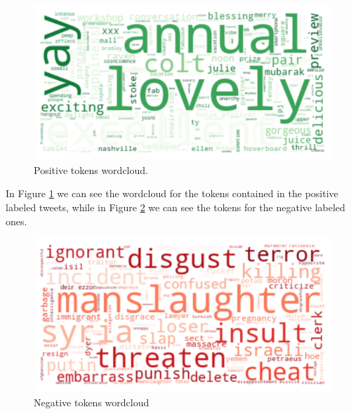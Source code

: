 \documentclass[11pt,twocolumn]{article}
\begin{document}
        \begin{figure}[h]
            \centering
            \includegraphics[width=\linewidth]{positive_tokens_wordcloud.pdf}
            \caption{Positive tokens wordcloud.}
            \label{fig:positive_tokens_wordcloud}
        \end{figure}

        \noindent
        In Figure \ref{fig:positive_tokens_wordcloud} we can see the wordcloud for the tokens contained in the
        positive labeled tweets, while in Figure \ref{fig:negative_tokens_wordcloud} we can see the tokens for
        the negative labeled ones.

        \begin{figure}[h]
            \centering
            \includegraphics[width=\linewidth]{negative_tokens_wordcloud.pdf}
            \caption{Negative tokens wordcloud}
            \label{fig:negative_tokens_wordcloud}
        \end{figure}
\end{document}
